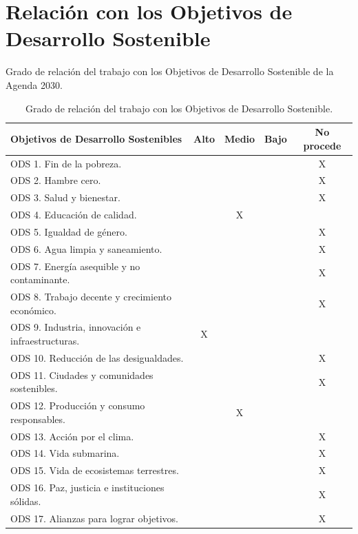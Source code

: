 \chapter{Relación con los Objetivos de Desarrollo Sostenible}
\label{anx:ods}
\hypertarget{RE3.2c}{}\label{RE3.2c}

Grado de relación del trabajo con los Objetivos de Desarrollo Sostenible de la
Agenda 2030.

\begin{table}[htbp]
    \centering
    \caption{Grado de relación del trabajo con los Objetivos de Desarrollo
             Sostenible.}
    \label{tab:ods}
    \begin{tabular}{lcccc}
        \toprule
        \textbf{Objetivos de Desarrollo Sostenibles} &
        \textbf{Alto} & \textbf{Medio} & \textbf{Bajo} &
        \textbf{No procede} \\
        \midrule
        ODS 1. Fin de la pobreza.                          &   &   &   & X \\
        ODS 2. Hambre cero.                                &   &   &   & X \\
        ODS 3. Salud y bienestar.                          &   &   &   & X \\
        ODS 4. Educación de calidad.                       &   & X &   &   \\
        ODS 5. Igualdad de género.                         &   &   &   & X \\
        ODS 6. Agua limpia y saneamiento.                  &   &   &   & X \\
        ODS 7. Energía asequible y no contaminante.        &   &   &   & X \\
        ODS 8. Trabajo decente y crecimiento económico.    &   &   &   & X \\
        ODS 9. Industria, innovación e infraestructuras.   & X &   &   &   \\
        ODS 10. Reducción de las desigualdades.            &   &   &   & X \\
        ODS 11. Ciudades y comunidades sostenibles.        &   &   &   & X \\
        ODS 12. Producción y consumo responsables.         &   & X &   &   \\
        ODS 13. Acción por el clima.                       &   &   &   & X \\
        ODS 14. Vida submarina.                            &   &   &   & X \\
        ODS 15. Vida de ecosistemas terrestres.            &   &   &   & X \\
        ODS 16. Paz, justicia e instituciones sólidas.     &   &   &   & X \\
        ODS 17. Alianzas para lograr objetivos.            &   &   &   & X \\
        \bottomrule
    \end{tabular}
\end{table}

